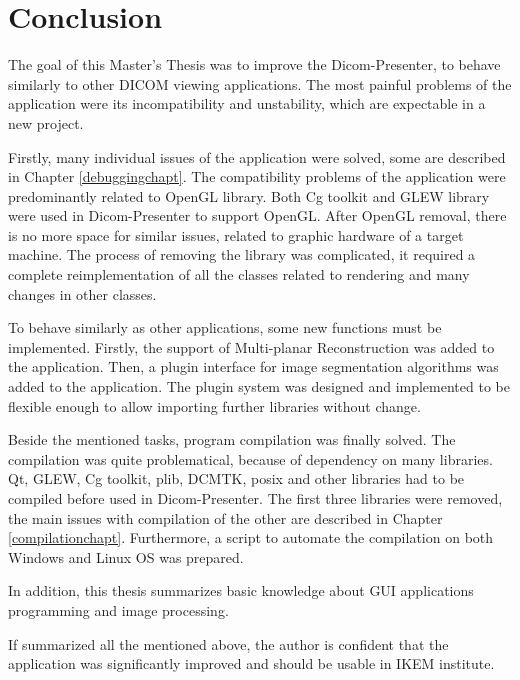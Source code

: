 \chapter{Conclusion}
\vspace{-10mm}
The goal of this Master's Thesis was to improve the Dicom-Presenter, to behave similarly to other DICOM viewing applications. The most painful problems of the application were its incompatibility and unstability, which are expectable in a new project.

Firstly, many individual issues of the application were solved, some are described in Chapter \ref{debuggingchapt}. The compatibility problems of the application were predominantly related to OpenGL library. Both Cg toolkit and GLEW library were used in Dicom-Presenter to support OpenGL. After OpenGL removal, there is no more space for similar issues, related to graphic hardware of a target machine. The process of removing the library was complicated, it required a complete reimplementation of all the classes related to rendering and many changes in other classes. 

To behave similarly as other applications, some new functions must be implemented. Firstly, the support of Multi-planar Reconstruction was added to the application. Then, a plugin interface for image segmentation algorithms was added to the application. The plugin system was designed and implemented to be flexible enough to allow importing further libraries without change.

Beside the mentioned tasks, program compilation was finally solved. The compilation was quite problematical, because of dependency on many libraries. Qt, GLEW, Cg toolkit, plib, DCMTK, posix and other libraries had to be compiled before used in Dicom-Presenter. The first three libraries were removed, the main issues with compilation of the other are described in Chapter \ref{compilationchapt}. Furthermore, a script to automate the compilation on both Windows and Linux OS was prepared.

In addition, this thesis summarizes basic knowledge about GUI applications programming and image processing.

If summarized all the mentioned above, the author is confident that the application was significantly improved and should be usable in IKEM institute.